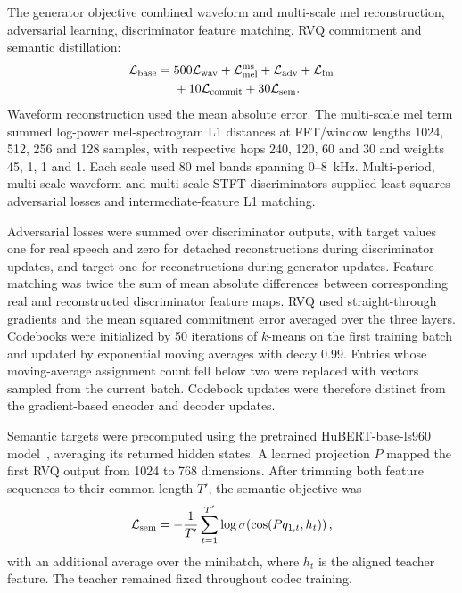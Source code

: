 \documentclass[final,5p,times,twocolumn]{elsarticle}
\begin{document}
The generator objective combined waveform and multi-scale mel reconstruction, adversarial learning, discriminator feature matching, RVQ commitment and semantic distillation:
\begin{equation}
\begin{split}
 \mathcal L_{\rm base}={}&500\mathcal L_{\rm wav}
 +\mathcal L_{\rm mel}^{\rm ms}
 +\mathcal L_{\rm adv}+\mathcal L_{\rm fm}\\
 &+10\mathcal L_{\rm commit}+30\mathcal L_{\rm sem}.
\end{split}
\end{equation}
Waveform reconstruction used the mean absolute error. The multi-scale mel term summed log-power mel-spectrogram L1 distances at FFT/window lengths 1024, 512, 256 and 128 samples, with respective hops 240, 120, 60 and 30 and weights 45, 1, 1 and 1. Each scale used 80 mel bands spanning 0--8~kHz. Multi-period, multi-scale waveform and multi-scale STFT discriminators supplied least-squares adversarial losses and intermediate-feature L1 matching.

Adversarial losses were summed over discriminator outputs, with target values one for real speech and zero for detached reconstructions during discriminator updates, and target one for reconstructions during generator updates. Feature matching was twice the sum of mean absolute differences between corresponding real and reconstructed discriminator feature maps. RVQ used straight-through gradients and the mean squared commitment error averaged over the three layers. Codebooks were initialized by 50 iterations of $k$-means on the first training batch and updated by exponential moving averages with decay 0.99. Entries whose moving-average assignment count fell below two were replaced with vectors sampled from the current batch. Codebook updates were therefore distinct from the gradient-based encoder and decoder updates.

Semantic targets were precomputed using the pretrained HuBERT-base-ls960 model~\cite{hubert}, averaging its returned hidden states. A learned projection $P$ mapped the first RVQ output from 1024 to 768 dimensions. After trimming both feature sequences to their common length $T'$, the semantic objective was
\begin{equation}
 \mathcal L_{\rm sem}
 =-\frac{1}{T'}\sum_{t=1}^{T'}
 \log\sigma\!\left(\cos(Pq_{1,t},h_t)\right),
\end{equation}
with an additional average over the minibatch, where $h_t$ is the aligned teacher feature. The teacher remained fixed throughout codec training.
\end{document}
